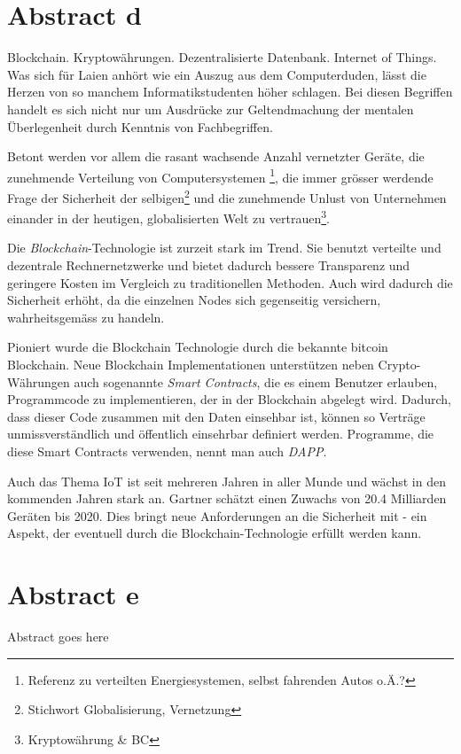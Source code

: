 \chapter{Abstract d}
\label{cha:abstract_d}

Blockchain. Kryptowährungen. Dezentralisierte Datenbank. Internet of Things. Was sich für Laien anhört wie ein Auszug aus dem Computerduden, lässt die Herzen von so manchem Informatikstudenten höher schlagen. Bei diesen Begriffen handelt es sich nicht nur um Ausdrücke zur Geltendmachung der mentalen Überlegenheit durch Kenntnis von Fachbegriffen.

Betont werden vor allem die rasant wachsende Anzahl vernetzter Geräte, die zunehmende Verteilung von Computersystemen \footnote{Referenz zu verteilten Energiesystemen, selbst fahrenden Autos o.Ä.?}, die immer grösser werdende Frage der Sicherheit der selbigen\footnote{Stichwort Globalisierung, Vernetzung} und die zunehmende Unlust von Unternehmen einander in der heutigen, globalisierten Welt zu vertrauen\footnote{Kryptowährung \& BC}. 


Die \emph{Blockchain}-Technologie ist zurzeit stark im Trend. Sie benutzt verteilte und dezentrale Rechnernetzwerke und bietet dadurch bessere Transparenz und geringere Kosten im Vergleich zu traditionellen Methoden. Auch wird dadurch die Sicherheit erhöht, da die einzelnen Nodes sich gegenseitig versichern, wahrheitsgemäss zu handeln.\cite{BlockchainRevolution}

Pioniert wurde die Blockchain Technologie durch die bekannte bitcoin Blockchain. Neue Blockchain Implementationen unterstützen neben Crypto-Währungen auch sogenannte \emph{Smart Contracts}, die es einem Benutzer erlauben, Programmcode zu implementieren, der in der Blockchain abgelegt wird. Dadurch, dass dieser Code zusammen mit den Daten einsehbar ist, können so Verträge unmissverständlich und öffentlich einsehrbar definiert werden. Programme, die diese Smart Contracts verwenden, nennt man auch \emph{\acrfull{DAPP}}.\cite{BlockchainRevolution}

Auch das Thema \acrshort{IoT} ist seit mehreren Jahren in aller Munde und wächst in den kommenden Jahren stark an. Gartner schätzt einen Zuwachs von 20.4 Milliarden Geräten bis 2020. Dies bringt neue Anforderungen an die Sicherheit mit - ein Aspekt, der eventuell durch die Blockchain-Technologie erfüllt werden kann.\cite{gartner.com_iot,BlockchainRevolution}



\chapter{Abstract e}
\label{cha:abstract_e}

Abstract goes here
